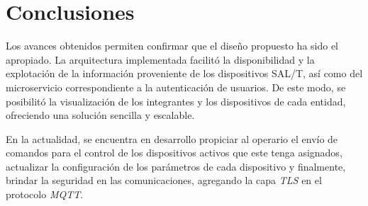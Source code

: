 
\section{Conclusiones}

Los avances obtenidos permiten confirmar que el diseño propuesto ha sido el apropiado. La arquitectura implementada facilitó la disponibilidad y la explotación de la información proveniente de los dispositivos SAL/T, así como del microservicio correspondiente a la autenticación de usuarios.
De este modo, se posibilitó la visualización de los integrantes y los dispositivos de cada entidad, ofreciendo una solución sencilla y escalable. 

En la actualidad, se encuentra en desarrollo propiciar al operario el envío de comandos para el control de los dispositivos activos que este tenga asignados, actualizar la configuración de los parámetros de cada dispositivo
y finalmente, brindar la seguridad en las comunicaciones, agregando la capa \textit{TLS} en el protocolo \textit{MQTT}.
